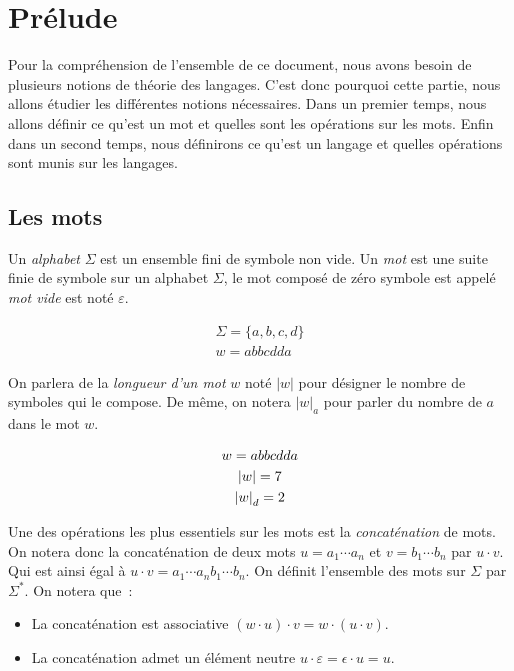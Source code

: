 \section{Prélude}

Pour la compréhension de l'ensemble de ce document, nous avons besoin de
plusieurs notions de théorie des langages. C'est donc pourquoi cette partie,
nous allons étudier les différentes notions nécessaires. Dans un premier temps,
nous allons définir ce qu'est un mot et quelles sont les opérations sur les
mots. Enfin dans un second temps, nous définirons ce qu'est un langage et
quelles opérations sont munis sur les langages.

\subsection{Les mots}

Un \textit{alphabet} \(\Sigma\) est un ensemble fini de symbole non vide. Un
\textit{mot} est une suite finie de symbole sur un alphabet \(\Sigma\), le mot
composé de zéro symbole est appelé \textit{mot vide} est noté \(\varepsilon\).

\begin{example}
    \begin{gather}
        \Sigma = \{a, b, c, d\} \\
        w = abbcdda
    \end{gather}
\end{example}

On parlera de la \textit{longueur d'un mot} \(w\) noté \(|w|\) pour désigner le
nombre de symboles qui le compose. De même, on notera \({|w|}_a\) pour parler
du nombre de \(a\) dans le mot \(w\).

\begin{example}
    \begin{gather}
        w = abbcdda \notag \\
        |w| = 7 \\
        {|w|}_d = 2
    \end{gather}
\end{example}

Une des opérations les plus essentiels sur les mots est la
\textit{concaténation} de mots. On notera donc la concaténation de deux mots
\(u = a_1 \cdots a_n\) et \(v = b_1 \cdots b_n\) par \(u \cdot v\). Qui est
ainsi égal à \(u \cdot v = a_1 \cdots a_n b_1 \cdots b_n\). On définit
l'ensemble des mots sur \(\Sigma\) par \(\Sigma ^ *\). On notera que~:

\begin{itemize}[label=\textbullet]
    \item La concaténation est associative \((w \cdot u) \cdot v = w \cdot (u \cdot v)\).
    \item La concaténation admet un élément neutre \(u \cdot \varepsilon = \epsilon \cdot
          u = u\).
\end{itemize}

